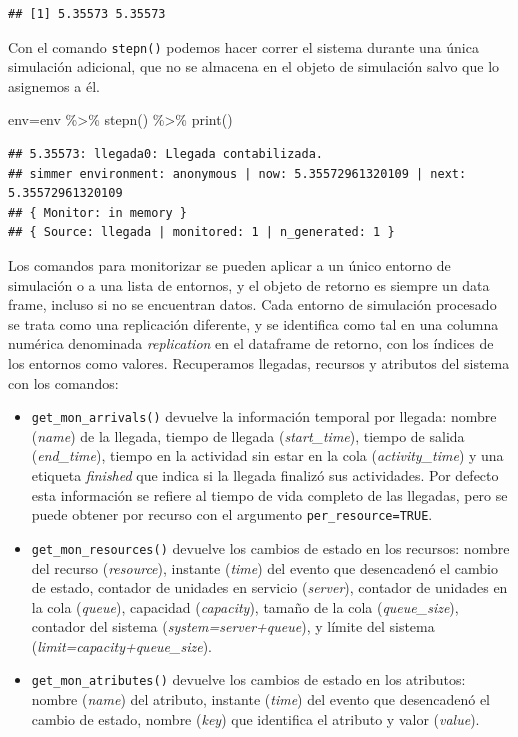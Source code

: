 \documentclass[
]{book}
\newenvironment{Shaded}{\begin{snugshade}}{\end{snugshade}}
\newcommand{\FunctionTok}[1]{\textcolor[rgb]{0.00,0.00,0.00}{#1}}
\newcommand{\NormalTok}[1]{#1}
\newcommand{\OtherTok}[1]{\textcolor[rgb]{0.56,0.35,0.01}{#1}}
\newcommand{\SpecialCharTok}[1]{\textcolor[rgb]{0.00,0.00,0.00}{#1}}
\theoremstyle{definition}
\theoremstyle{definition}
\theoremstyle{definition}
\theoremstyle{definition}
\theoremstyle{remark}
\begin{document}
\begin{verbatim}
## [1] 5.35573 5.35573
\end{verbatim}

Con el comando \texttt{stepn()} podemos hacer correr el sistema durante una única simulación adicional, que no se almacena en el objeto de simulación salvo que lo asignemos a él.

\begin{Shaded}
\begin{Highlighting}[]
\NormalTok{env}\OtherTok{=}\NormalTok{env }\SpecialCharTok{\%\textgreater{}\%}
  \FunctionTok{stepn}\NormalTok{() }\SpecialCharTok{\%\textgreater{}\%}
  \FunctionTok{print}\NormalTok{()}
\end{Highlighting}
\end{Shaded}

\begin{verbatim}
## 5.35573: llegada0: Llegada contabilizada.
## simmer environment: anonymous | now: 5.35572961320109 | next: 5.35572961320109
## { Monitor: in memory }
## { Source: llegada | monitored: 1 | n_generated: 1 }
\end{verbatim}

Los comandos para monitorizar se pueden aplicar a un único entorno de simulación o a una lista de entornos, y el objeto de retorno es siempre un data frame, incluso si no se encuentran datos. Cada entorno de simulación procesado se trata como una replicación diferente, y se identifica como tal en una columna numérica denominada \emph{replication} en el dataframe de retorno, con los índices de los entornos como valores. Recuperamos llegadas, recursos y atributos del sistema con los comandos:

\begin{itemize}
\item
  \texttt{get\_mon\_arrivals()} devuelve la información temporal por llegada: nombre (\emph{name}) de la llegada, tiempo de llegada (\emph{start\_time}), tiempo de salida (\emph{end\_time}), tiempo en la actividad sin estar en la cola (\emph{activity\_time}) y una etiqueta \emph{finished} que indica si la llegada finalizó sus actividades. Por defecto esta información se refiere al tiempo de vida completo de las llegadas, pero se puede obtener por recurso con el argumento \texttt{per\_resource=TRUE}.
\item
  \texttt{get\_mon\_resources()} devuelve los cambios de estado en los recursos: nombre del recurso (\emph{resource}), instante (\emph{time}) del evento que desencadenó el cambio de estado, contador de unidades en servicio (\emph{server}), contador de unidades en la cola (\emph{queue}), capacidad (\emph{capacity}), tamaño de la cola (\emph{queue\_size}), contador del sistema (\emph{system=server+queue}), y límite del sistema (\emph{limit=capacity+queue\_size}).
\item
  \texttt{get\_mon\_atributes()} devuelve los cambios de estado en los atributos: nombre (\emph{name}) del atributo, instante (\emph{time}) del evento que desencadenó el cambio de estado, nombre (\emph{key}) que identifica el atributo y valor (\emph{value}).
\end{itemize}
\end{document}
